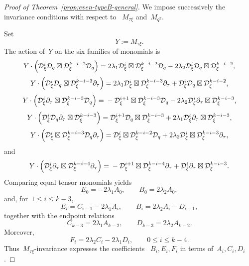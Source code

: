 \documentclass[12pt,a4paper]{amsart}
\theoremstyle{thm}
\theoremstyle{definition}
\newcommand {\Dq}{\cD_q}
\newcommand {\Dxi}{\cD_\xi}
\begin{document}
\begin{proof}[Proof of Theorem~\textup{\ref{prop:even-typeB-general}}]
We impose successively the invariance conditions with respect to~%
\(M_{\tau\xi}\) and~\(M_{q^2}\).

Set
\[
Y:=M_{\tau\xi}.
\]
The action of~\(Y\) on the six families of monomials is
\[
\begin{array}{r@{}l}
Y\cdot
\left(
\Dxi^i\Dq\boxtimes \Dxi^{k-i-2}\Dq
\right)
={}&
2\lambda_1\Dxi^i\boxtimes \Dxi^{k-i-2}\Dq
-
2\lambda_2\Dxi^i\Dq\boxtimes \Dxi^{k-i-2},
\end{array}
\]
\[
\begin{array}{r@{}l}
Y\cdot
\left(
\Dxi^i\Dq\boxtimes \Dxi^{k-i-3}\partial_\tau
\right)
={}&
2\lambda_1\Dxi^i\boxtimes \Dxi^{k-i-3}\partial_\tau
+
\Dxi^i\Dq\boxtimes \Dxi^{k-i-2},
\end{array}
\]
\[
\begin{array}{r@{}l}
Y\cdot
\left(
\Dxi^i\partial_\tau\boxtimes \Dxi^{k-i-3}\Dq
\right)
={}&
{}-
\Dxi^{i+1}\boxtimes \Dxi^{k-i-3}\Dq
-
2\lambda_2\Dxi^i\partial_\tau\boxtimes \Dxi^{k-i-3},
\end{array}
\]
\[
\begin{array}{r@{}l}
Y\cdot
\left(
\Dxi^i\Dq\partial_\tau\boxtimes \Dxi^{k-i-3}
\right)
={}&
\Dxi^{i+1}\Dq\boxtimes \Dxi^{k-i-3}
+
2\lambda_1\Dxi^i\partial_\tau\boxtimes \Dxi^{k-i-3},
\end{array}
\]
\[
\begin{array}{r@{}l}
Y\cdot
\left(
\Dxi^i\boxtimes \Dxi^{k-i-3}\Dq\partial_\tau
\right)
={}&
\Dxi^i\boxtimes \Dxi^{k-i-2}\Dq
+
2\lambda_2\Dxi^i\boxtimes \Dxi^{k-i-3}\partial_\tau,
\end{array}
\]
and
\[
\begin{array}{r@{}l}
Y\cdot
\left(
\Dxi^i\partial_\tau\boxtimes \Dxi^{k-i-4}\partial_\tau
\right)
={}&
{}-
\Dxi^{i+1}\boxtimes \Dxi^{k-i-4}\partial_\tau
+
\Dxi^i\partial_\tau\boxtimes \Dxi^{k-i-3}.
\end{array}
\]
Comparing equal tensor monomials yields
\[
E_0=-2\lambda_1A_0,
\qquad
B_0=2\lambda_2A_0,
\]
and, for~\(1\leq i\leq k-3\),
\[
E_i=C_{i-1}-2\lambda_1A_i,
\qquad
B_i=2\lambda_2A_i-D_{i-1},
\]
together with the endpoint relations
\[
C_{k-3}=2\lambda_1A_{k-2},
\qquad
D_{k-3}=2\lambda_2A_{k-2}.
\]
Moreover,
\[
F_i=2\lambda_2C_i-2\lambda_1D_i,
\qquad
0\leq i\leq k-4.
\]
Thus~\(M_{\tau\xi}\)-invariance expresses the coefficients~%
\(B_i,E_i,F_i\) in terms of~\(A_i,C_i,D_i\).


\end{proof}
\end{document}
